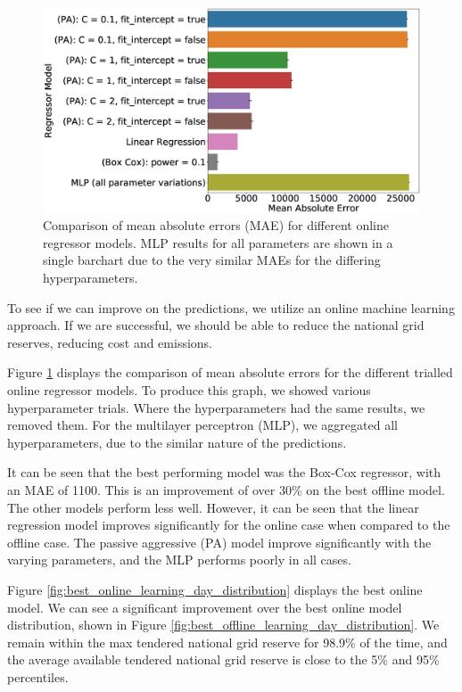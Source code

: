 \begin{figure}[h]
\centering
\includegraphics[width=\columnwidth]{Chapter5/figures/market-forecasting/results/online_model_mae_barplot.eps}
\caption{Comparison of mean absolute errors (MAE) for different online regressor models. MLP results for all parameters are shown in a single barchart due to the very similar MAEs for the differing hyperparameters.}
\label{fig:online_model_mae_barplot}
\end{figure}



To see if we can improve on the predictions, we utilize an online machine learning approach. If we are successful, we should be able to reduce the national grid reserves, reducing cost and emissions.


Figure \ref{fig:online_model_mae_barplot} displays the comparison of mean absolute errors for the different trialled online regressor models. To produce this graph, we showed various hyperparameter trials. Where the hyperparameters had the same results, we removed them. For the multilayer perceptron (MLP), we aggregated all hyperparameters, due to the similar nature of the predictions.

It can be seen that the best performing model was the Box-Cox regressor, with an MAE of 1100. This is an improvement of over 30\% on the best offline model. The other models perform less well. However, it can be seen that the linear regression model improves significantly for the online case when compared to the offline case. The passive aggressive (PA) model improve significantly with the varying parameters, and the MLP performs poorly in all cases.



Figure \ref{fig:best_online_learning_day_distribution} displays the best online model. We can see a significant improvement over the best online model distribution, shown in Figure \ref{fig:best_offline_learning_day_distribution}. We remain within the max tendered national grid reserve for 98.9\% of the time, and the average available tendered national grid reserve is close to the 5\% and 95\% percentiles.



